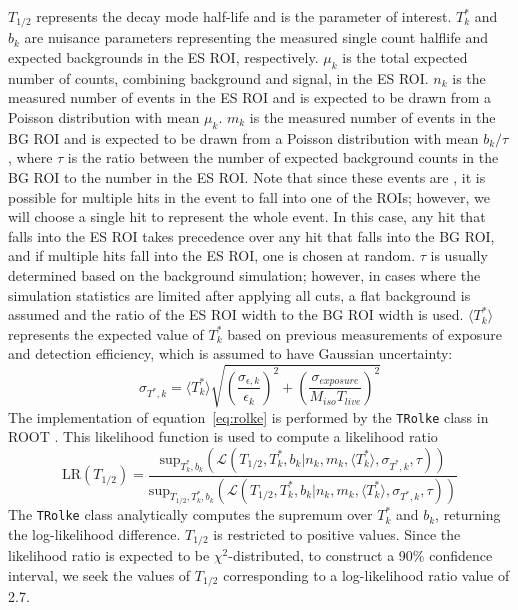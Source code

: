 \documentclass[/main.tex]{subfiles}
\begin{document}
$T_{1/2}$ represents the decay mode half-life and is the parameter of interest.
$T^*_k$ and $b_k$ are nuisance parameters representing the measured single count halflife and expected backgrounds in the ES ROI, respectively.
$\mu_k$ is the total expected number of counts, combining background and signal, in the ES ROI.
$n_k$ is the measured number of events in the ES ROI and is expected to be drawn from a Poisson distribution with mean $\mu_k$.
$m_k$ is the measured number of events in the BG ROI and is expected to be drawn from a Poisson distribution with mean $b_k/\tau$, where $\tau$ is the ratio between the number of expected background counts in the BG ROI to the number in the ES ROI.
Note that since these events are \msmd, it is possible for multiple hits in the event to fall into one of the ROIs; however, we will choose a single hit to represent the whole event.
In this case, any hit that falls into the ES ROI takes precedence over any hit that falls into the BG ROI, and if multiple hits fall into the ES ROI, one is chosen at random.
$\tau$ is usually determined based on the background simulation; however, in cases where the simulation statistics are limited after applying all cuts, a flat background is assumed and the ratio of the ES ROI width to the BG ROI width is used.
$\langle T^*_k\rangle$ represents the expected value of $T^*_k$ based on previous measurements of exposure and detection efficiency, which is assumed to have Gaussian uncertainty:
\begin{equation}
  \sigma_{T^*,k} = \langle T^*_k\rangle\sqrt{(\frac{\sigma_{\epsilon,k}}{\epsilon_k })^2 + (\frac{\sigma_{exposure}}{M_{iso}T_{live} })^2}
\end{equation}
The implementation of equation~\ref{eq:rolke} is performed by the \texttt{TRolke} class in ROOT \cite{2005rolke}.
This likelihood function is used to compute a likelihood ratio
\begin{equation}
  \mathrm{LR}(T_{1/2}) = \frac{\mathrm{sup}_{T^*_k,b_k}(\mathcal{L}(T_{1/2},T^*_k,b_k|n_k,m_k,\langle T^*_k\rangle, \sigma_{T^*,k},\tau))}{\mathrm{sup}_{T_{1/2},T^*_k,b_k}(\mathcal{L}(T_{1/2},T^*_k,b_k|n_k,m_k,\langle T^*_k\rangle, \sigma_{T^*,k},\tau))}
\end{equation}
The \texttt{TRolke} class analytically computes the supremum over $T^*_k$ and $b_k$, returning the log-likelihood difference.
$T_{1/2}$ is restricted to positive values.
Since the likelihood ratio is expected to be $\chi^2$-distributed, to construct a 90\% confidence interval, we seek the values of $T_{1/2}$ corresponding to a log-likelihood ratio value of 2.7.
\end{document}
